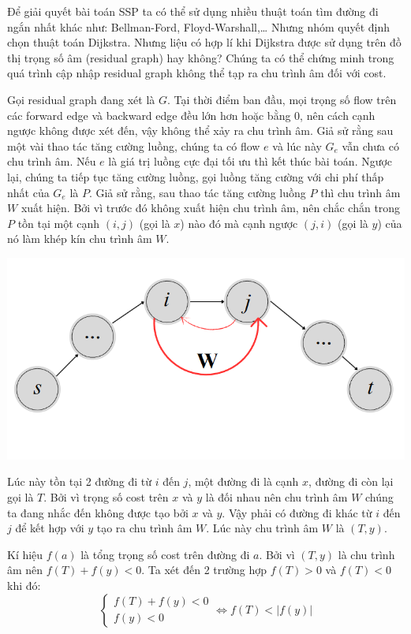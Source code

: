 \documentclass[a4paper]{article}
\begin{document}
{Để giải quyết bài toán SSP ta có thể sử dụng nhiều thuật toán tìm đường đi ngắn nhất khác như: Bellman-Ford, Floyd-Warshall,… Nhưng nhóm quyết định chọn thuật toán Dijkstra. Nhưng liệu có hợp lí khi Dijkstra được sử dụng trên đồ thị trọng số âm (residual graph) hay không? Chúng ta có thể chứng minh trong quá trình cập nhập residual graph không thể tạp ra chu trình âm đối với cost.}

{Gọi residual graph đang xét là $G$. Tại thời điểm ban đầu, mọi trọng số flow trên các forward edge và backward edge đều lớn hơn hoặc bằng 0, nên cách cạnh ngược không được xét đến, vậy không thể xảy ra chu trình âm. Giả sử rằng sau một vài thao tác tăng cường luồng, chúng ta có flow $e$ và lúc này $G_e$ vẫn chưa có chu trình âm. Nếu $e$ là giá trị luồng cực đại tối ưu thì kết thúc bài toán. Ngược lại, chúng ta tiếp tục tăng cường luồng, gọi luồng tăng cường với chi phí thấp nhất của $G_e$ là $P$. Giả sử rằng, sau thao tác tăng cường luồng $P$ thì chu trình âm $W$ xuất hiện. Bởi vì trước đó không xuất hiện chu trình âm, nên chắc chắn trong $P$ tồn tại một cạnh $(i,j)$ (gọi là $x$) nào đó mà cạnh ngược $(j,i)$ (gọi là $y$) của nó làm khép kín chu trình âm $W$.}
\begin{center}
    \includegraphics[width=0.5\linewidth]{huy1.png}   
\end{center}

{Lúc này tồn tại 2 đường đi từ $i$ đến $j$, một đường đi là cạnh $x$, đường đi còn lại gọi là $T$. Bởi vì trọng số cost trên $x$ và $y$ là đối nhau nên chu trình âm $W$ chúng ta đang nhắc đến không được tạo bởi $x$ và $y$. Vậy phải có đường đi khác từ $i$ đến $j$ để kết hợp với $y$ tạo ra chu trình âm $W$. Lúc này chu trình âm $W$ là $(T,y)$. }

{Kí hiệu $f(a)$ là tổng trọng số cost trên đường đi $a$. Bởi vì $(T,y)$ là chu trình âm nên $f(T) + f(y) < 0$. Ta xét đến 2 trường hợp $f(T) > 0$ và $f(T) < 0$ khi đó: }
\[
\left\{\begin{matrix}
f(T) + f(y) < 0\\
 f(y) < 0
\end{matrix}\right.
\Leftrightarrow f(T) <  \left|f(y) \right|
\]
\end{document}
